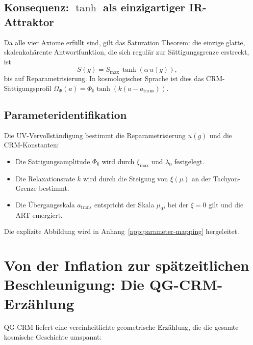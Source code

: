 \documentclass[aps,prd,twocolumn,superscriptaddress,nofootinbib]{revtex4-2}
\begin{document}
\subsection{Konsequenz: $\tanh$ als einzigartiger IR-Attraktor}

Da alle vier Axiome erfüllt sind, gilt das Saturation Theorem: die einzige glatte, skalenkohärente Antwortfunktion, die sich regulär zur Sättigungsgrenze erstreckt, ist
\begin{equation}
S(g) = S_\mathrm{max}\,\tanh(\alpha\,u(g)),
\end{equation}
bis auf Reparametrisierung. In kosmologischer Sprache ist dies das CRM-Sättigungsprofil $\Omega_\Phi(a) = \Phi_0\tanh(k(a - a_\mathrm{trans}))$.

\subsection{Parameteridentifikation}

Die UV-Vervollständigung bestimmt die Reparametrisierung $u(g)$ und die CRM-Konstanten:
\begin{itemize}
\item Die Sättigungsamplitude $\Phi_0$ wird durch $\xi_\mathrm{max}$ und $\lambda_0$ festgelegt.
\item Die Relaxationsrate $k$ wird durch die Steigung von $\xi(\mu)$ an der Tachyon-Grenze bestimmt.
\item Die Übergangsskala $a_\mathrm{trans}$ entspricht der Skala $\mu_0$, bei der $\xi = 0$ gilt und die ART emergiert.
\end{itemize}

Die explizite Abbildung wird in Anhang~\ref{app:parameter-mapping} hergeleitet.


\section{Von der Inflation zur spätzeitlichen Beschleunigung: Die QG-CRM-Erzählung}
\label{sec:narrative}

QG-CRM liefert eine vereinheitlichte geometrische Erzählung, die die gesamte kosmische Geschichte umspannt:
\end{document}

